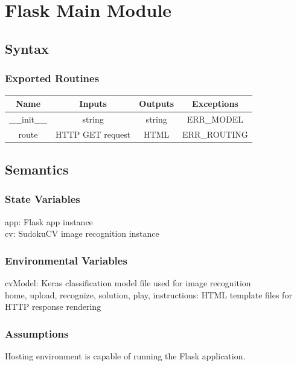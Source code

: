 \documentclass[11pt]{article}
\begin{document}
    

\section{Flask Main Module}
		\subsection{Syntax}
		\subsubsection{Exported Routines}
		\begin{tabular}[width=\textwidth, pos]{|c|c|c|c|}
			
			\hline
			\textbf{Name}& \textbf{Inputs} & \textbf{Outputs} & \textbf{Exceptions} \\ \hline
			\_\_init\_\_ & string & string & ERR\_MODEL \\
			route & HTTP GET request & HTML & ERR\_ROUTING \\ 

			
			\hline
			
		\end{tabular}
		
		\subsection{Semantics}
		\subsubsection{State Variables}
		app: Flask app instance \\
		cv: SudokuCV image recognition instance
		
		\subsubsection{Environmental Variables}
		cvModel: Keras classification model file used for image recognition \\
		home, upload, recognize, solution, play, instructions: HTML template files for HTTP response rendering
		
		\subsubsection{Assumptions}
		Hosting environment is capable of running the Flask application.
		
\end{document}
